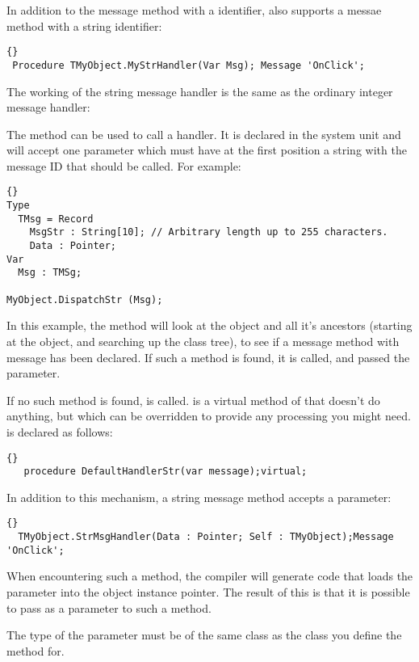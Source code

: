 \documentclass{report}
\begin{document}
In addition to the message method with a  identifier,
\fpc also supports a messae method with a string identifier:
\begin{lstlisting}{}
 Procedure TMyObject.MyStrHandler(Var Msg); Message 'OnClick';
\end{lstlisting}{}

The working of the string message handler is the same as the ordinary
integer message handler:

The  method can be used to call a 
handler. It is declared in the system unit and will accept one parameter
which must have at the first position a string with the message ID that
should be called. For example:
\begin{lstlisting}{}
Type 
  TMsg = Record
    MsgStr : String[10]; // Arbitrary length up to 255 characters.
    Data : Pointer;
Var
  Msg : TMSg;

MyObject.DispatchStr (Msg);
\end{lstlisting}{}
In this example, the  method will look at the object and 
all it's ancestors (starting at the object, and searching up the class tree), 
to see if a message method with message  has been
declared. If such a method is found, it is called, and passed the 
 parameter.

If no such method is found,  is called.
 is a virtual method of  that doesn't do 
anything, but which can be overridden to provide any processing you might
need.  is declared as follows:
\begin{lstlisting}{}
   procedure DefaultHandlerStr(var message);virtual;
\end{lstlisting}{}

In addition to this mechanism, a string message method accepts a 
parameter:
\begin{lstlisting}{}
  TMyObject.StrMsgHandler(Data : Pointer; Self : TMyObject);Message 'OnClick';
\end{lstlisting}{}
When encountering such a method, the compiler will generate code that loads
the  parameter into the object instance pointer. The result of
this is that it is possible to pass  as a parameter to such a
method. 

\begin{remark} 
The type of the  parameter must be of the same class
as the class you define the method for.
\end{remark}
\end{document}
